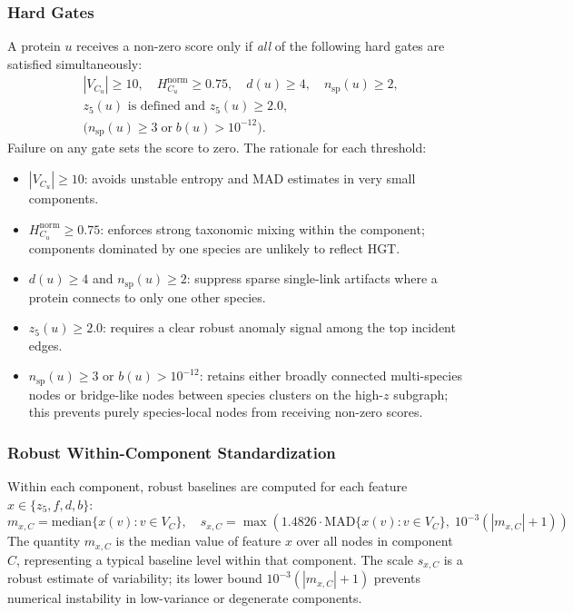\documentclass[11pt]{article}
\begin{document}
\subsubsection{Hard Gates}
\label{subsubsec:gates}

A protein $u$ receives a non-zero score only if \textit{all} of the following hard gates are satisfied simultaneously:
\begin{equation}
\begin{aligned}
&|V_{C_u}| \ge 10, \quad H_{C_u}^{\mathrm{norm}} \ge 0.75, \quad d(u) \ge 4, \quad n_{\mathrm{sp}}(u) \ge 2, \\
&z_5(u) \text{ is defined and } z_5(u) \ge 2.0, \\
&\bigl(n_{\mathrm{sp}}(u) \ge 3 \;\text{or}\; b(u) > 10^{-12}\bigr).
\end{aligned}
\end{equation}
Failure on any gate sets the score to zero. The rationale for each threshold:
\begin{itemize}[noitemsep]
    \item $|V_{C_u}| \ge 10$: avoids unstable entropy and MAD estimates in very small components.
    \item $H_{C_u}^{\mathrm{norm}} \ge 0.75$: enforces strong taxonomic mixing within the component; components dominated by one species are unlikely to reflect HGT.
    \item $d(u) \ge 4$ and $n_{\mathrm{sp}}(u) \ge 2$: suppress sparse single-link artifacts where a protein connects to only one other species.
    \item $z_5(u) \ge 2.0$: requires a clear robust anomaly signal among the top incident edges.
    \item $n_{\mathrm{sp}}(u) \ge 3$ or $b(u) > 10^{-12}$: retains either broadly connected multi-species nodes or bridge-like nodes between species clusters on the high-$z$ subgraph; this prevents purely species-local nodes from receiving non-zero scores.
\end{itemize}

\subsubsection{Robust Within-Component Standardization}

Within each component, robust baselines are computed for each feature $x \in \{z_5, f, d, b\}$:
\begin{equation}
m_{x,C} = \mathrm{median}\{x(v) : v \in V_C\},\quad
s_{x,C} = \max\!\left(1.4826 \cdot \mathrm{MAD}\{x(v) : v \in V_C\},\; 10^{-3}(|m_{x,C}|+1)\right)
\end{equation}
The quantity $m_{x,C}$ is the median value of feature $x$ over all nodes in component $C$, representing a typical baseline level within that component. The scale $s_{x,C}$ is a robust estimate of variability; its lower bound $10^{-3}(|m_{x,C}|+1)$ prevents numerical instability in low-variance or degenerate components.
\end{document}
